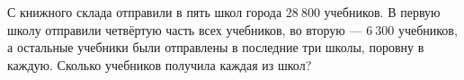 \begin{ex}
	\begin{condition}
		С книжного склада отправили в пять школ города \( 28\:800 \) учебников. В первую школу отправили четвёртую часть всех учебников, во вторую --- \( 6\:300 \) учебников, а остальные учебники были отправлены в последние три школы, поровну в каждую. Сколько учебников получила каждая из школ?
	\end{condition}
\end{ex}